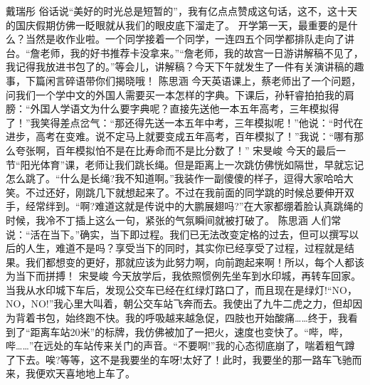 {}\markdownRendererInterblockSeparator
{}戴瑞彤\markdownRendererInterblockSeparator
{}俗话说“美好的时光总是短暂的”，我有亿点点赞成这句话，这不，这十天的国庆假期仿佛一眨眼就从我们的眼皮底下溜走了。\markdownRendererInterblockSeparator
{}开学第一天，最重要的是什么？当然是收作业啦。一个同学接着一个同学，一连四五个同学都排队走向了讲台。“詹老师，我的好书推荐卡没拿来。”“詹老师，我的故宫一日游讲解稿不见了，我记得我放进书包了的。”等会儿，讲解稿？今天下午就发生了一件有关演讲稿的趣事，下篇闲言碎语带你们揭晓哦！ \markdownRendererInterblockSeparator
{}\markdownRendererInterblockSeparator
{}陈思涵\markdownRendererInterblockSeparator
{}今天英语课上，蔡老师出了一个问题，问我们一个学中文的外国人需要买一本怎样的字典。下课后，孙轩睿拍拍我的肩膀：“外国人学语文为什么要字典呢？直接先送他一本五年高考，三年模拟得了！”我笑得差点岔气：“那还得先送一本五年中考，三年模拟呢！”他说：“时代在进步，高考在变难。说不定马上就要变成五年高考，百年模拟了！”我说：“哪有那么夸张啊，百年模拟怕不是在比寿命而不是比分数了！”\markdownRendererInterblockSeparator
{}\markdownRendererInterblockSeparator
{}宋旻峻\markdownRendererInterblockSeparator
{}今天的最后一节“阳光体育”课，老师让我们跳长绳。但是距离上一次跳仿佛恍如隔世，早就忘记怎么跳了。“什么是长绳?我不知道啊。”我装作一副傻傻的样子，逗得大家哈哈大笑。不过还好，刚跳几下就想起来了。不过在我前面的同学跳的时候总要伸开双手，经常绊到。“啊?难道这就是传说中的大鹏展翅吗?”在大家都绷着脸认真跳绳的时候，我冷不丁插上这么一句，紧张的气氛瞬间就被打破了。\markdownRendererInterblockSeparator
{}\markdownRendererInterblockSeparator
{}陈思涵\markdownRendererInterblockSeparator
{}人们常说：“活在当下。”确实，当下即过程。我们已无法改变定格的过去，但可以撰写以后的人生，难道不是吗？享受当下的同时，其实你已经享受了过程，过程就是结果。我们都想变的更好，那就应该为此努力啊，向前跑起来啊！所以，每个人都该为当下而拼搏！\markdownRendererInterblockSeparator
{}\markdownRendererInterblockSeparator
{}宋旻峻\markdownRendererInterblockSeparator
{}今天放学后，我依照惯例先坐车到水印城，再转车回家。当我从水印城下车后，发现公交车已经在红绿灯路口了，而且现在是绿灯!“NO，NO，NO!”我心里大叫着，朝公交车站飞奔而去。我使出了九牛二虎之力，但却因为背着书包，始终跑不快。我的呼吸越来越急促，四肢也开始酸痛……终于，我看到了“距离车站20米”的标牌，我仿佛被加了一把火，速度也变快了。“哔，哔，哔……”在远处的车站传来关门的声音。“不要啊!”我的心态彻底崩了，喘着粗气蹲了下去。唉?等等，这不是我要坐的车呀!太好了！此时，我要坐的那一路车飞驰而来，我便欢天喜地地上车了。\markdownRendererInterblockSeparator
